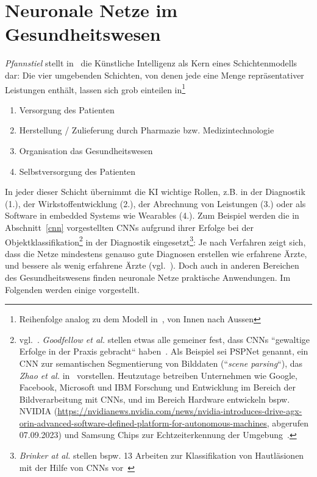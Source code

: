 \chapter{Neuronale Netze im Gesundheitswesen}\label{ch:gesundheitswesen}



\textit{Pfannstiel} stellt in~\cite[35, Abb. 1.14]{Pfa22} die Künstliche Intelligenz als Kern eines Schichtenmodells dar: Die vier umgebenden Schichten, von denen jede eine Menge repräsentativer Leistungen enthält, lassen sich grob einteilen in\footnote{
    Reihenfolge analog zu dem Modell in~\cite{Pfa22}, von Innen nach Aussen
}

\begin{enumerate}
    \item Versorgung des Patienten
    \item Herstellung / Zulieferung durch Pharmazie bzw. Medizintechnologie
    \item Organisation das Gesundheitswesen
    \item Selbstversorgung des Patienten
\end{enumerate}


In jeder dieser Schicht übernimmt die KI wichtige Rollen, z.B. in der Diagnostik (1.), der Wirkstoffentwicklung (2.), der Abrechnung von Leistungen (3.) oder als Software in embedded Systems wie Wearables (4.). Zum Beispiel werden die in Abschnitt~\ref{cnn} vorgestellten CNNs aufgrund ihrer Erfolge bei der Objektklassifikation\footnote{
    vgl.~\cite[330]{Ert21b}. \textit{Goodfellow et al.} stellen etwas alle gemeiner fest, dass CNNs ``gewaltige Erfolge in der Praxis gebracht`` haben~\cite[369]{GBC18}. Als Beispiel sei PSPNet genannt, ein CNN zur semantischen Segmentierung von Bilddaten (``\textit{scene parsing}``), das \textit{Zhao et al.} in~\cite{ZSQ+17} vorstellen. Heutzutage betreiben Unternehmen wie Google, Facebook, Microsoft und IBM Forschung und Entwicklung im Bereich der Bildverarbeitung mit CNNs, und im Bereich Hardware entwickeln bspw. NVIDIA (\url{https://nvidianews.nvidia.com/news/nvidia-introduces-drive-agx-orin-advanced-software-defined-platform-for-autonomous-machines}, abgerufen 07.09.2023) und Samsung Chips zur Echtzeiterkennung der Umgebung~\cite[440]{LBH15}.
} in der Diagnostik eingesetzt\footnote{
    \textit{Brinker at al.} stellen bspw. 13 Arbeiten zur Klassifikation von Hautläsionen mit der Hilfe von CNNs vor~\cite{BHU+18}
}: Je nach Verfahren zeigt sich, dass die Netze mindestens genauso gute Diagnosen erstellen wie erfahrene Ärzte, und bessere als wenig erfahrene Ärzte (vgl.~\cite[7]{SZJ+19}). Doch auch in anderen Bereichen des Gesundheitswesens finden neuronale Netze praktische Anwendungen. Im Folgenden werden einige vorgestellt.



